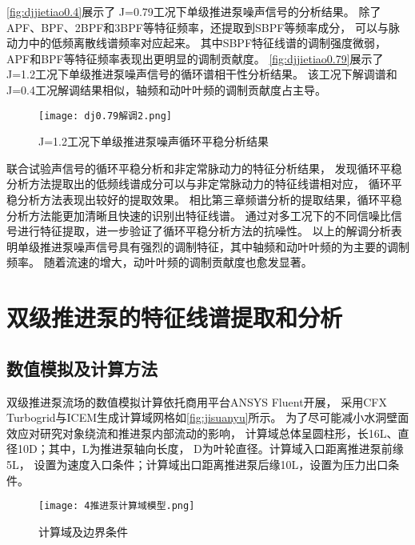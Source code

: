 \autoref{fig:djjietiao0.4}展示了 J=0.79工况下单级推进泵噪声信号的分析结果。
除了APF、BPF、2BPF和3BPF等特征频率，还提取到SBPF等频率成分，
可以与脉动力中的低频离散线谱频率对应起来。
其中SBPF特征线谱的调制强度微弱，APF和BPF等特征频率表现出更明显的调制贡献度。
\autoref{fig:djjietiao0.79}展示了 J=1.2工况下单级推进泵噪声信号的循环谱相干性分析结果。
该工况下解调谱和J=0.4工况解调结果相似，轴频和动叶叶频的调制贡献度占主导。
\begin{figure}[htbp]
    \centering
    \texttt{[image: dj0.79解调2.png]}
    \caption{\label{fig:djjietiao0.79}J=1.2工况下单级推进泵噪声循环平稳分析结果}
\end{figure}

联合试验声信号的循环平稳分析和非定常脉动力的特征分析结果，
发现循环平稳分析方法提取出的低频线谱成分可以与非定常脉动力的特征线谱相对应，
循环平稳分析方法表现出较好的提取效果。
相比第三章频谱分析的提取结果，循环平稳分析方法能更加清晰且快速的识别出特征线谱。
通过对多工况下的不同信噪比信号进行特征提取，进一步验证了循环平稳分析方法的抗噪性。
以上的解调分析表明单级推进泵噪声信号具有强烈的调制特征，其中轴频和动叶叶频的为主要的调制频率。
随着流速的增大，动叶叶频的调制贡献度也愈发显著。

\section{双级推进泵的特征线谱提取和分析}
\subsection{数值模拟及计算方法}
双级推进泵流场的数值模拟计算依托商用平台ANSYS Fluent开展，
采用CFX Turbogrid与ICEM生成计算域网格如\autoref{fig:jisuanyu}所示。
为了尽可能减小水洞壁面效应对研究对象绕流和推进泵内部流动的影响，
计算域总体呈圆柱形，长16L、直径10D；其中，L为推进泵轴向长度，
D为叶轮直径。计算域入口距离推进泵前缘5L，
设置为速度入口条件；计算域出口距离推进泵后缘10L，设置为压力出口条件。
\begin{figure}[htbp]
    \centering
    \texttt{[image: 4推进泵计算域模型.png]}
    \caption{\label{fig:jisuanyu}计算域及边界条件}
\end{figure}

